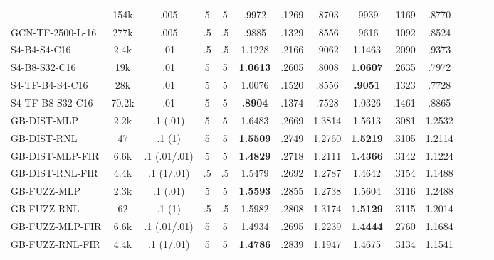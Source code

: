 \begin{table*}[h]
\begin{tabular}{lccccccccccccc}
            & 154k & .005 & 5 & 5 & .9972 & .1269 & .8703 & .9939 & .1169 & .8770 & \\
        GCN-TF-2500-L-16               
            & 277k & .005 & .5 & .5 & .9885 & .1329 & .8556 & .9616 & .1092 & .8524 & \\
        \midrule
        S4-B4-S4-C16              
            & 2.4k & .01 & .5 & .5 & 1.1228 & .2166 & .9062 & 1.1463 & .2090 & .9373 & \\
        S4-B8-S32-C16               
            & 19k & .01 & 5 & 5 & \textbf{1.0613} & .2605 & .8008 & \textbf{1.0607} & .2635 & .7972 & \\
        \midrule
        S4-TF-B4-S4-C16              
            & 28k & .01 & 5 & 5 & 1.0076 & .1520 & .8556 & \textbf{.9051} & .1323 & .7728 & \\
        S4-TF-B8-S32-C16               
            & 70.2k & .01 & 5 & 5 & \textbf{.8904} & .1374 & .7528 & 1.0326 & .1461 & .8865 & \\
        \midrule
        GB-DIST-MLP             
            & 2.2k & .1 (.01) & 5 & 5 & 1.6483 & .2669 & 1.3814 & 1.5613 & .3081 & 1.2532 & \\
        GB-DIST-RNL             
            & 47 & .1 (1) & 5 & 5 & \textbf{1.5509} & .2749 & 1.2760 & \textbf{1.5219} & .3105 & 1.2114 & \\
        \midrule
        GB-DIST-MLP-FIR
            & 6.6k & .1 (.01/.01) & 5 & 5 & \textbf{1.4829} & .2718 & 1.2111 & \textbf{1.4366} & .3142 & 1.1224 & \\
        GB-DIST-RNL-FIR         
            & 4.4k & .1 (1/.01) & .5 & .5 & 1.5479 & .2692 & 1.2787 & 1.4642 & .3154 & 1.1488 & \\
        \midrule
        GB-FUZZ-MLP             
            & 2.3k & .1 (.01) & 5 & 5 & \textbf{1.5593} & .2855 & 1.2738 & 1.5604 & .3116 & 1.2488 & \\
        GB-FUZZ-RNL             
            & 62 & .1 (1) & .5 & .5 & 1.5982 & .2808 & 1.3174 & \textbf{1.5129} & .3115 & 1.2014 & \\
        \midrule
        GB-FUZZ-MLP-FIR
            & 6.6k & .1 (.01/.01) & 5 & 5 & 1.4934 & .2695 & 1.2239 & \textbf{1.4444} & .2760 & 1.1684 & \\
        GB-FUZZ-RNL-FIR         
            & 4.4k & .1 (1/.01) & 5 & 5 & \textbf{1.4786} & .2839 & 1.1947 & 1.4675 & .3134 & 1.1541 & \\
        \bottomrule 
    \end{tabular}
    \label{tab:other_fx}
\end{table*}